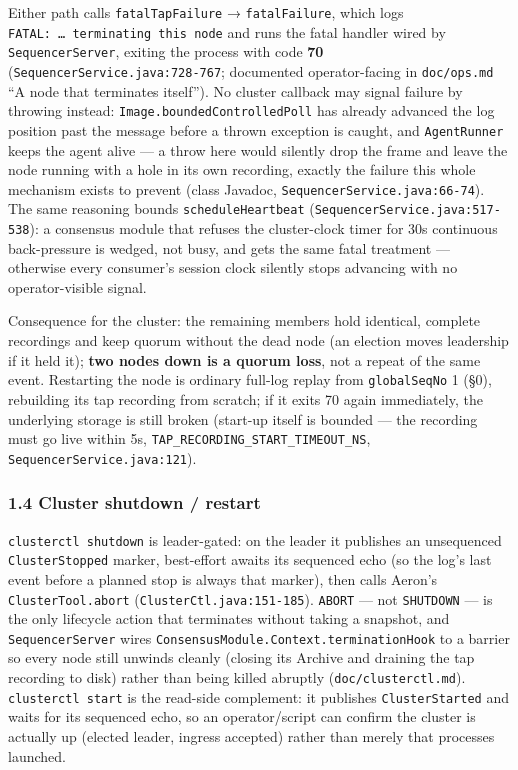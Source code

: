 \documentclass[
  10pt,
]{article}
\begin{document}
Either path calls \texttt{fatalTapFailure} → \texttt{fatalFailure},
which logs \texttt{FATAL:\ …\ terminating\ this\ node} and runs the
fatal handler wired by \texttt{SequencerServer}, exiting the process with
code \textbf{70} (\texttt{SequencerService.java:728-767}; documented
operator-facing in \texttt{doc/ops.md} ``A node that terminates
itself''). No cluster callback may signal failure by throwing instead:
\texttt{Image.boundedControlledPoll} has already advanced the log
position past the message before a thrown exception is caught, and
\texttt{AgentRunner} keeps the agent alive --- a throw here would
silently drop the frame and leave the node running with a hole in its
own recording, exactly the failure this whole mechanism exists to
prevent (class Javadoc, \texttt{SequencerService.java:66-74}). The same
reasoning bounds \texttt{scheduleHeartbeat}
(\texttt{SequencerService.java:517-538}): a consensus module that
refuses the cluster-clock timer for 30s continuous back-pressure is
wedged, not busy, and gets the same fatal treatment --- otherwise every
consumer's session clock silently stops advancing with no
operator-visible signal.

Consequence for the cluster: the remaining members hold identical,
complete recordings and keep quorum without the dead node (an election
moves leadership if it held it); \textbf{two nodes down is a quorum
loss}, not a repeat of the same event. Restarting the node is ordinary
full-log replay from \texttt{globalSeqNo} 1 (§0), rebuilding its tap
recording from scratch; if it exits 70 again immediately, the underlying
storage is still broken (start-up itself is bounded --- the recording
must go live within 5s, \texttt{TAP\_RECORDING\_START\_TIMEOUT\_NS},
\texttt{SequencerService.java:121}).

\subsubsection{1.4 Cluster shutdown /
restart}\label{cluster-shutdown-restart}

\texttt{clusterctl\ shutdown} is leader-gated: on the leader it
publishes an unsequenced \texttt{ClusterStopped} marker, best-effort
awaits its sequenced echo (so the log's last event before a planned stop
is always that marker), then calls Aeron's \texttt{ClusterTool.abort}
(\texttt{ClusterCtl.java:151-185}). \texttt{ABORT} --- not
\texttt{SHUTDOWN} --- is the only lifecycle action that terminates
without taking a snapshot, and \texttt{SequencerServer} wires
\texttt{ConsensusModule.Context.terminationHook} to a barrier so every
node still unwinds cleanly (closing its Archive and draining the tap
recording to disk) rather than being killed abruptly
(\texttt{doc/clusterctl.md}). \texttt{clusterctl\ start} is the
read-side complement: it publishes \texttt{ClusterStarted} and waits for
its sequenced echo, so an operator/script can confirm the cluster is
actually up (elected leader, ingress accepted) rather than merely that
processes launched.
\end{document}

